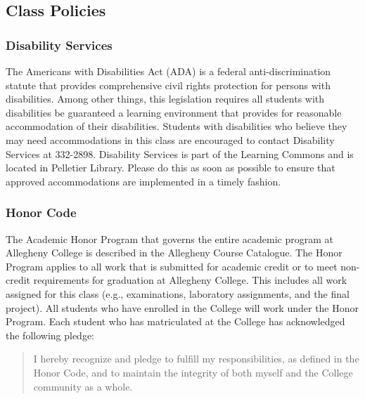 \subsection*{Class Policies}

\subsubsection*{Disability Services}

The Americans with Disabilities Act (ADA) is a federal anti-discrimination statute that provides comprehensive civil
rights protection for persons with disabilities.  Among other things, this legislation requires all students with
disabilities be guaranteed a learning environment that provides for reasonable accommodation of their disabilities.
Students with disabilities who believe they may need accommodations in this class are encouraged to contact Disability
Services at 332-2898.  Disability Services is part of the Learning Commons and is located in Pelletier Library.
Please do this as soon as possible to ensure that approved accommodations are implemented in a timely fashion.

\subsubsection*{Honor Code}

The Academic Honor Program that governs the entire academic program at Allegheny College is described in the Allegheny
Course Catalogue.  The Honor Program applies to all work that is submitted for academic credit or to meet non-credit
requirements for graduation at Allegheny College.  This includes all work assigned for this class (e.g., examinations,
laboratory assignments, and the final project).  All students who have enrolled in the College will work under the Honor
Program.  Each student who has matriculated at the College has acknowledged the following pledge:

\begin{quote}
I hereby recognize and pledge to fulfill my responsibilities, as defined in the Honor Code, and to maintain the
integrity of both myself and the College community as a whole.  
\end{quote}


